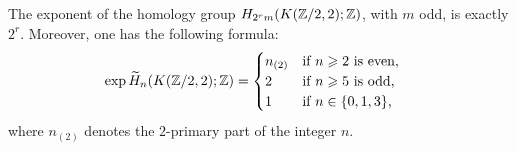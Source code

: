 The exponent of the homology group $H_{2^r m}(K(\mathbb{Z}/2,2);\mathbb{Z})$, with $m$ odd, is exactly $2^r$. Moreover, one has the following formula:
\begin{align*}
\exp\widetilde{H}_n(K(\mathbb{Z}/2,2);\mathbb{Z})&=\begin{cases}
n_{(2)} &\text{if $n\geqslant2$ is even,}\\
2 &\text{if $n\geqslant5$ is odd,}\\
1 &\text{if $n\in\{0,1,3\}$,}
\end{cases}
\end{align*}
where $n_{(2)}$ denotes the $2$-primary part of the integer $n$.
\endinput